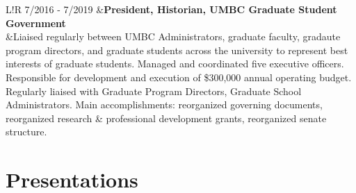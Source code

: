 \documentclass[10pt]{article}
\newcommand\VRule{\color{black}\vrule width 0.5pt}
\begin{document}
\begin{longtable}{L!{\VRule}R}
7/2016 - 7/2019 &{\bf President, Historian, UMBC Graduate Student Government }\\
&{Liaised regularly between UMBC Administrators, graduate faculty, gradaute program directors, and graduate students across the university to represent best interests of graduate students. Managed and coordinated five executive officers. Responsible for development and execution of \$300,000 annual operating budget. Regularly liaised with Graduate Program Directors, Graduate School Administrators. Main accomplishments: reorganized governing documents, reorganized research \& professional development grants, reorganized senate structure.}\\[5pt]
\end{longtable}
\vspace{-10pt}

\section*{Presentations}
\vspace{-10pt}
\end{document}

